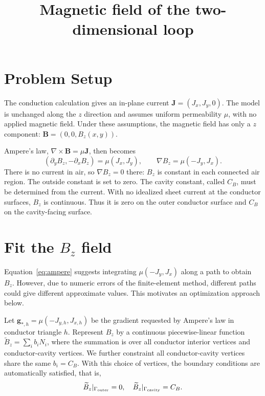 \documentclass[11pt]{article}
\title{Magnetic field of the two-dimensional loop}
\author{}
\date{}
\begin{document}
\maketitle

\section{Problem Setup}
The conduction calculation gives an in-plane current
$\bm J=(J_x,J_y,0)$. The model is unchanged along the $z$
direction and assumes uniform permeability $\mu$, with no
applied magnetic field. Under these assumptions, the magnetic
field has only a $z$ component:
$\bm B=(0,0,B_z(x,y))$.

Ampere's law, $\nabla\times\bm B=\mu\bm J$, then becomes
\begin{equation}
 (\partial_yB_z,-\partial_xB_z)=\mu(J_x,J_y),
 \qquad
 \nabla B_z=\mu(-J_y,J_x).
 \label{eq:ampere}
\end{equation}
There is no current in air, so $\nabla B_z=0$ there: $B_z$
is constant in each connected air region. The outside constant
is set to zero. The cavity constant, called $C_B$, must be
determined from the current. With no idealized sheet current
at the conductor surfaces, $B_z$ is continuous. Thus it is
zero on the outer conductor surface and $C_B$ on the
cavity-facing surface.

\section{Fit the $B_z$ field}
Equation~\eqref{eq:ampere} suggests integrating
$\mu(-J_y,J_x)$ along a path to obtain $B_z$. However,
due to numeric errors of the finite-element method,
different paths could give different approximate values.
This motivates an optimization approach below.

Let $\bm g_{*,h}=\mu(-J_{y,h},J_{x,h})$ be the gradient
requested by Ampere's law in conductor triangle $h$.
Represent $B_z$ by a continuous piecewise-linear function
$\widetilde B_z = \sum_{i}b_iN_i$,
where the summation is over all conductor interior vertices
and conductor-cavity vertices. We further constraint all
conductor-cavity vertices share the same $b_i=C_B$.
With this choice of vertices, the boundary conditions are
automatically satisfied, that is,
\begin{equation}
 \widetilde B_z|_{\Gamma_{\rm outer}}=0,\quad
 \widetilde B_z|_{\Gamma_{\rm cavity}}=C_B.
\end{equation}
\end{document}
